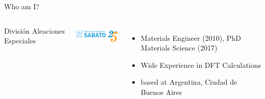 \begin{frame}{Who am I?}
\begin{columns}
\begin{columns}
    \tiny     División Aleaciones Especiales \par
      \includegraphics[height=1cm]{./presentation/logo-isabt25.png}
  \end{columns}
  \hspace{1cm}
  \begin{itemize}
    \item Materials Engineer (2010), PhD Materials Science (2017)
    \item Wide Experience in DFT Calculations
    \item based at Argentina, Ciudad de Buenos Aires
  \end{itemize}

\end{columns}

\end{frame}

